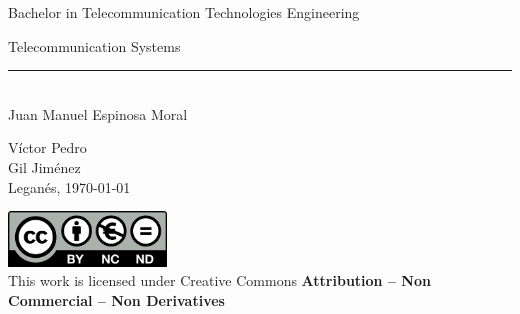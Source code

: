 \documentclass[../main.tex]{subfiles}
\begin{document}
\begin{titlepage}
	\begin{sffamily}
	\color{azulUC3M}

	\begin{center}

		\begin{figure}[H]
		\end{figure}

		\vspace{2.5cm}

		\begin{Large}
			Bachelor in Telecommunication Technologies Engineering\\			
			\bigskip
		\end{Large}

		 	{\Huge Telecommunication Systems}\\
		 	\vspace*{0.5cm}
	 		\rule{10.5cm}{0.1mm}\\
			\vspace*{0.9cm}
			{\LARGE Juan Manuel Espinosa Moral}\\ 
			\vspace*{1cm}

		\begin{Large}
			Víctor Pedro\\
			Gil Jiménez\\
			Leganés, \today\\
		\end{Large}
	\end{center}

	\vfill

	\color{black}

	\includegraphics[width=4.2cm]{images/UC3M/creativecommons.png}\\
	This work is licensed under Creative Commons \textbf{Attribution – Non Commercial – Non Derivatives}

	\end{sffamily}
\end{titlepage}
\end{document}
